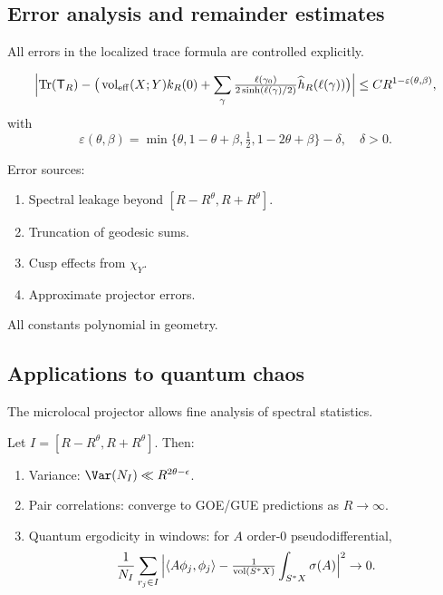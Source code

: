 \subsection{Error analysis and remainder estimates}\label{subsec:micro-errors}

All errors in the localized trace formula are controlled explicitly.

\begin{theorem}\label{thm:error-estimates}
\[
\Big|\mathrm{Tr}(\mathsf{T}_R)-\big(\operatorname{vol}_{\mathrm{eff}}(X;Y)k_R(0)+\sum_{\gamma}\tfrac{\ell(\gamma_0)}{2\sinh(\ell(\gamma)/2)}\widehat{h}_R(\ell(\gamma))\big)\Big|\leq CR^{1-\varepsilon(\theta,\beta)},
\]
with
\[
\varepsilon(\theta,\beta)=\min\{\theta,1-\theta+\beta,\tfrac12,1-2\theta+\beta\}-\delta,\quad \delta>0.
\]
\end{theorem}

Error sources:
\begin{enumerate}
\item Spectral leakage beyond $[R-R^\theta,R+R^\theta]$.
\item Truncation of geodesic sums.
\item Cusp effects from $\chi_Y$.
\item Approximate projector errors.
\end{enumerate}
All constants polynomial in geometry.

\subsection{Applications to quantum chaos}\label{subsec:micro-chaos}

The microlocal projector allows fine analysis of spectral statistics.

\begin{theorem}\label{thm:spectral-stats}
Let $I=[R-R^\theta,R+R^\theta]$. Then:
\begin{enumerate}
\item Variance: $\Var(N_I)\ll R^{2\theta-\epsilon}$.
\item Pair correlations: converge to GOE/GUE predictions as $R\to\infty$.
\item Quantum ergodicity in windows: for $A$ order-0 pseudodifferential,
\[
\frac{1}{N_I}\sum_{r_j\in I}\Big|\langle A\phi_j,\phi_j\rangle-\tfrac{1}{\operatorname{vol}(S^*X)}\int_{S^*X}\sigma(A)\Big|^2\to0.
\]
\end{enumerate}
\end{theorem}

